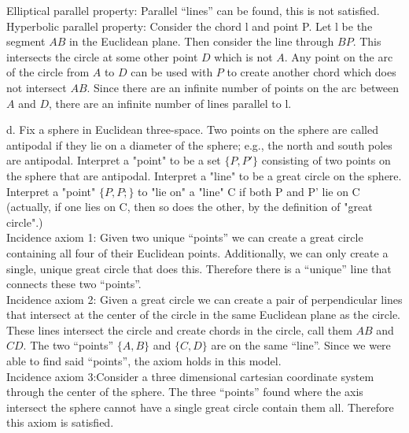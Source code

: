 \documentclass[12pt,letterpaper]{article}
\begin{document}
Elliptical parallel property: Parallel ``lines'' can be found, this is not satisfied.\\

Hyperbolic parallel property: Consider the chord l and point P.  Let l be the segment $AB$ in the Euclidean plane.  Then consider the line through $BP$. This intersects the circle at some other point $D$ which is not $A$.  Any point on the arc of the circle from $A$ to $D$ can be used with $P$ to create another chord which does not intersect $AB$.  Since there are an infinite number of points on the arc between $A$ and $D$, there are an infinite number of lines parallel to l. \\




\newpage

d. Fix a sphere in Euclidean three-space.  Two points on the sphere are called antipodal if they lie on a diameter of the sphere;  e.g., the north and south poles are antipodal.  Interpret a "point" to be a set $\{P,P'\}$ consisting of two points on the sphere that are antipodal.  Interpret a "line" to be a great circle on the sphere.  Interpret a "point" $\{P,P;\}$ to "lie on" a "line" C if both P and P' lie on C (actually, if one lies on C, then so does the other, by the definition of "great circle".)\\

Incidence axiom 1: Given two unique ``points'' we can create a great circle containing all four of their Euclidean points.  Additionally, we can only create a single, unique great circle that does this.  Therefore there is a ``unique'' line that connects these two ``points''.\\

Incidence axiom 2: Given a great circle we can create a pair of perpendicular lines that intersect at the center of the circle in the same Euclidean plane as the circle. These lines intersect the circle and create chords in the circle, call them $AB$ and $CD$.  The two ``points'' $\{A,B\}$ and $\{C,D\}$ are on the same ``line''.  Since we were able to find said ``points'', the axiom holds in this model.\\


Incidence axiom 3:Consider a three dimensional cartesian coordinate system through the center of the sphere.  The three ``points'' found where the axis intersect the sphere cannot have a single great circle contain them all. Therefore this axiom is satisfied.\\
\end{document}

